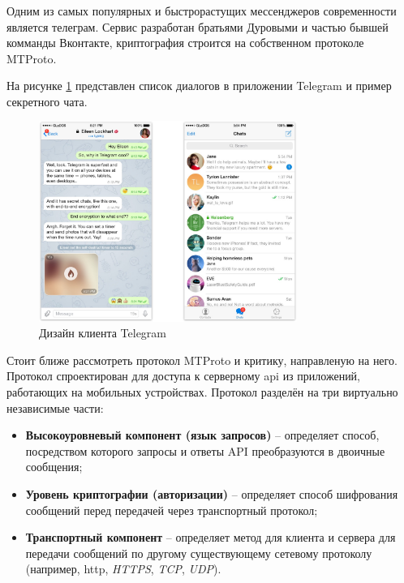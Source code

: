 \subsubsection{}
\label{sec:analysis:research:analogs:telegram}

Одним из самых популярных и быстрорастущих мессенджеров современности является телеграм. 
Сервис разработан братьями Дуровыми и частью бывшей комманды Вконтакте, криптография строится на собственном протоколе MTProto.

На рисунке \ref{sec:analysis:research:analogs:telegram:ui} представлен список диалогов в приложении Telegram и пример секретного чата.

\begin{figure}[h]
  \centering
    \includegraphics[width=0.75\textwidth]{inc/img/tg_combined.jpg}
  \caption{Дизайн клиента Telegram}
  \label{sec:analysis:research:analogs:telegram:ui}
\end{figure}

Стоит ближе рассмотреть протокол MTProto и критику, направленую на него. Протокол спроектирован для доступа к серверному \gls{api} из приложений, работающих на мобильных устройствах. 
Протокол разделён на три виртуально независимые части: 
\begin{itemize}
	\item \textbf{Высокоуровневый компонент (язык запросов)} -- определяет способ, посредством которого запросы и ответы API преобразуются в двоичные сообщения;
	\item \textbf{Уровень криптографии (авторизации)} -- определяет способ шифрования сообщений перед передачей через транспортный протокол;
	\item \textbf{Транспортный компонент} -- определяет метод для клиента и сервера для передачи сообщений по другому существующему сетевому протоколу (например, \gls{http}, \textit{HTTPS}, \textit{TCP}, \textit{UDP}).
\end{itemize}

